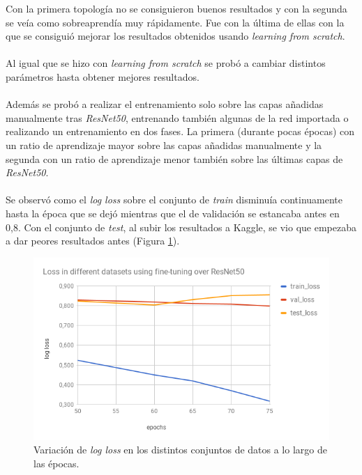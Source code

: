 Con la primera topología no se consiguieron buenos resultados y con la segunda se veía como sobreaprendía muy rápidamente. Fue con la última de ellas con la que se consiguió mejorar los resultados obtenidos usando \textit{learning from scratch}.
\\ \\
Al igual que se hizo con \textit{learning from scratch} se probó a cambiar distintos parámetros hasta obtener mejores resultados.
\\ \\
Además se probó a realizar el entrenamiento solo sobre las capas añadidas manualmente tras \textit{ResNet50}, entrenando también algunas de la red importada o realizando un entrenamiento en dos fases. La primera (durante pocas épocas) con un ratio de aprendizaje mayor sobre las capas añadidas manualmente y la segunda con un ratio de aprendizaje menor también sobre las últimas capas de \textit{ResNet50}.
\\ \\
Se observó como el \textit{log loss} sobre el conjunto de \textit{train} disminuía continuamente hasta la época que se dejó mientras que el de validación se estancaba antes en 0,8. Con el conjunto de \textit{test}, al subir los resultados a Kaggle, se vio que empezaba a dar peores resultados antes (Figura \ref{fig:loss-variation-fine-tuning}).

\begin{figure}[H]
	\centering
	\includegraphics[width=12cm]{img/loss-variation-fine-tuning}
	\caption{Variación de \textit{log loss} en los distintos conjuntos de datos a lo largo de las épocas.}
	\label{fig:loss-variation-fine-tuning}
\end{figure}

